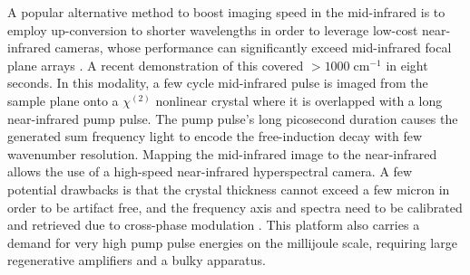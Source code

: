 \documentclass{optica-article}
\begin{document}


A popular alternative method to boost imaging speed in the mid-infrared is to employ up-conversion to shorter wavelengths in order to leverage low-cost near-infrared cameras, whose performance can significantly exceed mid-infrared focal plane arrays \cite{junaidVideorateMidinfraredHyperspectral2019,knezInfraredChemicalImaging2020,potmaRapidChemicallySelective2021}. A recent demonstration of this covered \mbox{$>$$1000 \; \mathrm{cm^{-1}}$} \cite{zhaoHighspeedScanlessEntire2023} in eight seconds. In this modality, a few cycle mid-infrared pulse is imaged from the sample plane onto a $\chi^{(2)}$ nonlinear crystal where it is overlapped with a long near-infrared pump pulse. The pump pulse's long picosecond duration causes the generated sum frequency light to encode the free-induction decay with few wavenumber resolution. Mapping the mid-infrared image to the near-infrared allows the use of a high-speed near-infrared hyperspectral camera. A few potential drawbacks is that the crystal thickness cannot exceed a few micron in order to be artifact free, and the frequency axis and spectra need to be calibrated and retrieved due to cross-phase modulation \cite{leeRemovingCrossphaseModulation2009}. This platform also carries a demand for very high pump pulse energies on the millijoule scale, requiring large regenerative amplifiers and a bulky apparatus.




\end{document}
